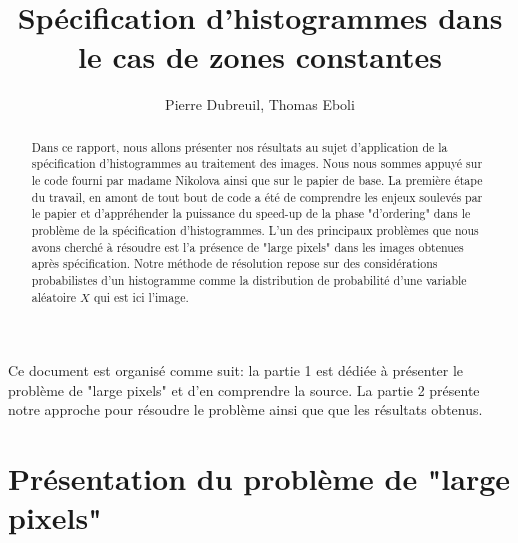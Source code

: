 \documentclass{report}
\title{Spécification d'histogrammes dans le cas de zones constantes}
\author{Pierre Dubreuil, Thomas Eboli}
\begin{document}
\maketitle

\begin{abstract}
Dans ce rapport, nous allons présenter nos résultats au sujet d'application de la spécification d'histogrammes au traitement des images. Nous nous sommes appuyé sur le code fourni par madame Nikolova ainsi que sur le papier de base. La première étape du travail, en amont de tout bout de code a été de comprendre les enjeux soulevés par le papier et d'appréhender la puissance du speed-up de la phase "d'ordering" dans le problème de la spécification d'histogrammes. L'un des principaux problèmes que nous avons cherché à résoudre est l'a présence de "large pixels" dans les images obtenues après spécification. Notre méthode de résolution repose sur des considérations probabilistes d'un histogramme comme la distribution de probabilité d'une variable aléatoire $X$ qui est ici l'image.
\end{abstract}

\paragraph*{}
Ce document est organisé comme suit: la partie 1 est dédiée à présenter le problème de "large pixels" et d'en comprendre la source. La partie 2 présente notre approche pour résoudre le problème ainsi que que les résultats obtenus.

\section*{Présentation du problème de "large pixels"}
\end{document}
